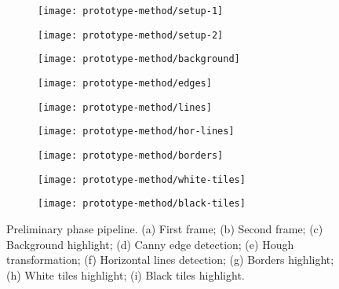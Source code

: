 \begin{figure}[t]
	\centering
	\begin{subfigure}{0.32\textwidth}
		\centering
		\texttt{[image: prototype-method/setup-1]}
		\caption{}
		\label{fig:setup_background}
	\end{subfigure}
	\hfill
	\begin{subfigure}{0.32\textwidth}
		\centering
		\texttt{[image: prototype-method/setup-2]}
		\caption{}
		\label{fig:setup_keyboard}
	\end{subfigure}
	\hfill
	\begin{subfigure}{0.32\textwidth}
		\centering
		\texttt{[image: prototype-method/background]}
		\caption{}
		\label{fig:keyboard_background}
	\end{subfigure}
	\hfill
	\begin{subfigure}{0.32\textwidth}
		\centering
		\texttt{[image: prototype-method/edges]}
		\caption{}
		\label{fig:canny-prototype}
	\end{subfigure}
	\hfill
	\begin{subfigure}{0.32\textwidth}
		\centering
		\texttt{[image: prototype-method/lines]}
		\caption{}
		\label{fig:hough}
	\end{subfigure}
	\hfill
	\begin{subfigure}{0.32\textwidth}
		\centering
		\texttt{[image: prototype-method/hor-lines]}
		\caption{}
		\label{fig:hor_lines}
	\end{subfigure}
	\hfill
	\begin{subfigure}{0.32\textwidth}
		\centering
		\texttt{[image: prototype-method/borders]}
		\caption{}
		\label{fig:borders}
	\end{subfigure}
	\hfill
	\begin{subfigure}{0.32\textwidth}
		\centering
		\texttt{[image: prototype-method/white-tiles]}
		\caption{}
		\label{fig:white_tiles}
	\end{subfigure}
	\hfill
	\begin{subfigure}{0.32\textwidth}
		\centering
		\texttt{[image: prototype-method/black-tiles]}
		\caption{}
		\label{fig:black_tiles}
	\end{subfigure}
	\caption{
		Preliminary phase pipeline.
		(a) First frame;
		(b) Second frame;
		(c) Background highlight;
		(d) Canny edge detection;
		(e) Hough transformation;
		(f) Horizontal lines detection;
		(g) Borders highlight;
		(h) White tiles highlight;
		(i) Black tiles highlight.
	}
	\label{fig:preprocessing-prototype}
\end{figure}


